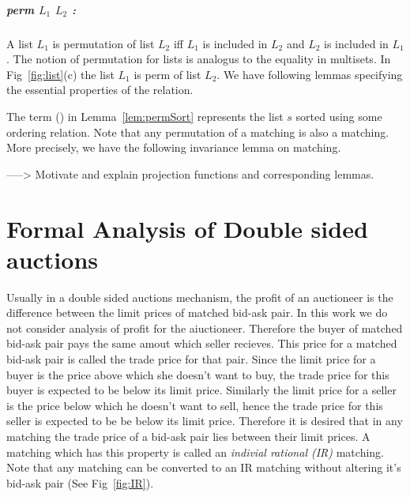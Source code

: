 \documentclass[a4paper,UKenglish,cleveref, autoref]{lipics-v2019}
\begin{document}
\subparagraph*{perm $L_1$ $L_2$ :} A list $L_1$  is permutation of list $L_2$  iff $L_1$  is included in $L_2$ and $L_2$ is included in $L_1$.  The notion of permutation for lists is analogus to the equality in multisets. In Fig~\ref{fig:list}(c) the list $L_1$  is perm of list $L_2$. We have following lemmas specifying the essential properties of the  relation.

\begin{lemma}
\end{lemma}
\begin{lemma}
\end{lemma}
\begin{lemma}\label{lem:permSort}
\end{lemma}

The term (\emph{}) in Lemma~\ref{lem:permSort} represents the list $s$ sorted using some ordering relation.  Note that any permutation of a matching is also a matching.  More precisely,  we have the following invariance lemma on matching.
\begin{lemma}
\end{lemma}
\begin{lemma}
\tw{ \textcolor{gray}{ } }
\end{lemma}

-----> Motivate and explain projection functions and corresponding lemmas. 





\section{Formal Analysis of Double sided auctions}
Usually in a double sided auctions mechanism, the profit of an auctioneer is the difference between the limit prices of matched bid-ask pair. In this work we do not consider analysis of profit for the aiuctioneer. Therefore the buyer of matched bid-ask pair pays the same amout which seller recieves. This price for a matched  bid-ask pair is called the trade price for that pair. Since the limit price for a buyer is the price above which she doesn't want to buy, the trade price for this buyer is expected to be below its limit price. Similarly the limit price for a seller is the price below which he doesn't want to sell, hence the trade price for this seller is expected to be be below its limit price. Therefore it is desired that in any matching the trade price of a bid-ask pair lies between their limit prices. A matching which has this property is called an \emph{indivial rational (IR)} matching. Note that any matching can be converted to an IR matching without altering it's bid-ask pair (See Fig~\ref{fig:IR}).
\end{document}
